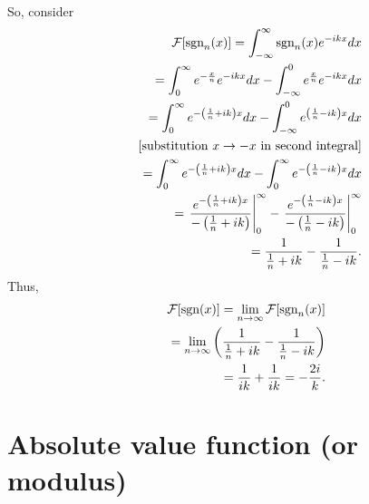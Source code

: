 So, consider
\begin{equation}
\begin{split}
  {\cal F}[\textrm{sgn}_n (x)]= \int_{-\infty}^\infty  \textrm{sgn}_n (x) e^{-i{kx}} dx   \\
\qquad =
\int_{0}^\infty  e^{-\frac{x}{n}} e^{-i{kx}} dx
-
\int_{-\infty}^0  e^{ \frac{x}{n}} e^{-i{kx}} dx
\\
\qquad =
\int_{0}^\infty  e^{-\left(\frac{1}{n}+i{k}\right) x} dx
-
\int_{-\infty}^0  e^{ \left(\frac{1}{n}-i{k}\right) x} dx
\\
\qquad \;
[\textrm{substitution }x \rightarrow -x \textrm{ in second integral}]\\
\qquad =
\int_{0}^\infty  e^{-\left(\frac{1}{n}+i{k}\right) x} dx
-
\int_{0}^\infty  e^{-\left(\frac{1}{n}-i{k}\right) x} dx
\\
\qquad =
\left.  \frac{ e^{-\left(\frac{1}{n}+i{k}\right) x}}{{-\left(\frac{1}{n}+i{k}\right)  }} \right|_{0}^\infty
-
\left.  \frac{ e^{-\left(\frac{1}{n}-i{k}\right) x}}{-\left(\frac{1}{n}-i{k}\right)} \right|_{0}^\infty
\\
\qquad =
  \frac{ 1}{  \frac{1}{n}+i{k} }
-
 \frac{ 1 }{ \frac{1}{n}-i{k} }
.
\end{split}
\label{2011-m-ftsgn1a}
\end{equation}
Thus,
\begin{equation}
\begin{split}
{\cal F}[\textrm{sgn}  (x)] =\lim_{n\rightarrow \infty}  {\cal F}[\textrm{sgn}_n (x)]
\\
\qquad =  \lim_{n\rightarrow \infty}  \left(
  \frac{ 1}{ \frac{1}{n}+i{k}   }
-
 \frac{ 1 }{  \frac{1}{n}-i{k}   }          \right)
\\
\qquad =
  \frac{ 1}{   i{k}  }
+
 \frac{ 1 }{  i{k} }
 =
  -\frac{2i}{ k }
.
\end{split}
\label{2011-m-ftsgn1b}
\end{equation}
\fi





\section{Absolute value function (or modulus)}

